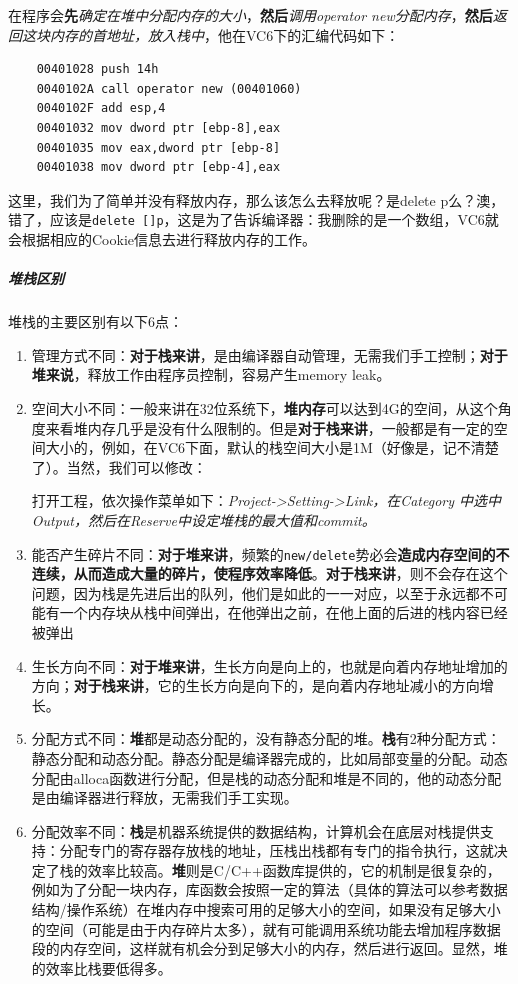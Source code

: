 \documentclass[UTF8,a4paper,12pt]{ctexbook}
\begin{document}
				在程序会\textbf{先}\textit{确定在堆中分配内存的大小}，\textbf{然后}\textit{调用operator new分配内存}，\textbf{然后}\textit{返回这块内存的首地址，放入栈中}，他在VC6下的汇编代码如下：
				\begin{lstlisting}
	00401028 push 14h
	0040102A call operator new (00401060)
	0040102F add esp,4
	00401032 mov dword ptr [ebp-8],eax
	00401035 mov eax,dword ptr [ebp-8]
	00401038 mov dword ptr [ebp-4],eax
				\end{lstlisting}
				
				
				这里，我们为了简单并没有释放内存，那么该怎么去释放呢？是delete p么？澳，错了，应该是\verb|delete []p|，这是为了告诉编译器：我删除的是一个数组，VC6就会根据相应的Cookie信息去进行释放内存的工作。
			
			\subparagraph{堆栈区别}
				堆栈的主要区别有以下6点：
				\begin{enumerate}[itemindent = 1em]
					\item 管理方式不同：\textbf{对于栈来讲}，是由编译器自动管理，无需我们手工控制；\textbf{对于堆来说}，释放工作由程序员控制，容易产生memory leak。
					
					\item 空间大小不同：一般来讲在32位系统下，\textbf{堆内存}可以达到4G的空间，从这个角度来看堆内存几乎是没有什么限制的。但是\textbf{对于栈来讲}，一般都是有一定的空间大小的，例如，在VC6下面，默认的栈空间大小是1M（好像是，记不清楚了）。当然，我们可以修改：
					
						打开工程，依次操作菜单如下：\textit{Project->Setting->Link，在Category 中选中Output，然后在Reserve中设定堆栈的最大值和commit。}
						
					\item 能否产生碎片不同：\textbf{对于堆来讲}，频繁的\verb|new/delete|势必会\textbf{造成内存空间的不连续，从而造成大量的碎片，使程序效率降低}。\textbf{对于栈来讲}，则不会存在这个问题，因为栈是先进后出的队列，他们是如此的一一对应，以至于永远都不可能有一个内存块从栈中间弹出，在他弹出之前，在他上面的后进的栈内容已经被弹出
					
					\item 生长方向不同：\textbf{对于堆来讲}，生长方向是向上的，也就是向着内存地址增加的方向；\textbf{对于栈来讲}，它的生长方向是向下的，是向着内存地址减小的方向增长。
					
					\item 分配方式不同：\textbf{堆}都是动态分配的，没有静态分配的堆。\textbf{栈}有2种分配方式：静态分配和动态分配。静态分配是编译器完成的，比如局部变量的分配。动态分配由alloca函数进行分配，但是栈的动态分配和堆是不同的，他的动态分配是由编译器进行释放，无需我们手工实现。
					
					\item 分配效率不同：\textbf{栈}是机器系统提供的数据结构，计算机会在底层对栈提供支持：分配专门的寄存器存放栈的地址，压栈出栈都有专门的指令执行，这就决定了栈的效率比较高。\textbf{堆}则是C/C++函数库提供的，它的机制是很复杂的，例如为了分配一块内存，库函数会按照一定的算法（具体的算法可以参考数据结构/操作系统）在堆内存中搜索可用的足够大小的空间，如果没有足够大小的空间（可能是由于内存碎片太多），就有可能调用系统功能去增加程序数据段的内存空间，这样就有机会分到足够大小的内存，然后进行返回。显然，堆的效率比栈要低得多。
				\end{enumerate}
				
\end{document}
